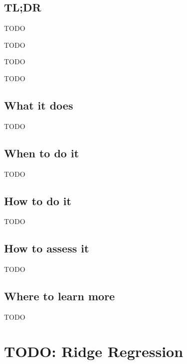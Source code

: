 \documentclass[
]{book}
\providecommand{\tightlist}{%
  \setlength{\itemsep}{0pt}\setlength{\parskip}{0pt}}
\begin{document}
\hypertarget{tldr-11}{%
\section{TL;DR}\label{tldr-11}}

\begin{description}
\tightlist
\item[What it does]
TODO
\item[When to do it]
TODO
\item[How to do it]
TODO
\item[How to assess it]
TODO
\end{description}

\hypertarget{what-it-does-11}{%
\section{What it does}\label{what-it-does-11}}

TODO

\hypertarget{when-to-do-it-11}{%
\section{When to do it}\label{when-to-do-it-11}}

TODO

\hypertarget{how-to-do-it-11}{%
\section{How to do it}\label{how-to-do-it-11}}

TODO

\hypertarget{how-to-assess-it-11}{%
\section{How to assess it}\label{how-to-assess-it-11}}

TODO

\hypertarget{where-to-learn-more-11}{%
\section{Where to learn more}\label{where-to-learn-more-11}}

TODO

\hypertarget{ridge-regression}{%
\chapter{TODO: Ridge Regression}\label{ridge-regression}}
\end{document}
